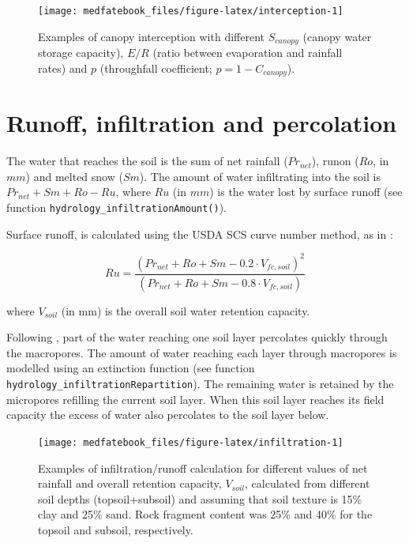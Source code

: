 \documentclass[]{book}
\begin{document}
\begin{figure}

{\centering \texttt{[image: medfatebook\_files/figure-latex/interception-1]} 

}

\caption{Examples of canopy interception with different
\(S_{canopy}\) (canopy water storage capacity), \(E/R\) (ratio between
evaporation and rainfall rates) and \(p\) (throughfall coefficient;
\(p = 1 - C_{canopy}\)).}\label{fig:interception}
\end{figure}

\section{Runoff, infiltration and percolation}\label{runoff}

The water that reaches the soil is the sum of net rainfall
(\(Pr_{net}\)), runon (\(Ro\), in \(mm\)) and melted snow (\(Sm\)). The
amount of water infiltrating into the soil is
\(Pr_{net} + Sm + Ro - Ru\), where \(Ru\) (in \(mm\)) is the water lost
by surface runoff (see function
\texttt{hydrology\_infiltrationAmount()}).

Surface runoff, is calculated using the USDA SCS curve number method, as
in \citet{Boughton1989}:

\begin{equation}
Ru=\frac{(Pr_{net} + Ro + Sm - 0.2 \cdot V_{fc, soil})^2}{(Pr_{net} + Ro + Sm - 0.8 \cdot V_{fc, soil})}
\end{equation}

where \(V_{soil}\) (in mm) is the overall soil water retention capacity.

Following \citet{Granier1999}, part of the water reaching one soil layer
percolates quickly through the macropores. The amount of water reaching
each layer through macropores is modelled using an extinction function
(see function \texttt{hydrology\_infiltrationRepartition}). The
remaining water is retained by the micropores refilling the current soil
layer. When this soil layer reaches its field capacity the excess of
water also percolates to the soil layer below.







\begin{figure}

{\centering \texttt{[image: medfatebook\_files/figure-latex/infiltration-1]} 

}

\caption{Examples of infiltration/runoff calculation for
different values of net rainfall and overall retention capacity,
\(V_{soil}\), calculated from different soil depths (topsoil+subsoil)
and assuming that soil texture is 15\% clay and 25\% sand. Rock fragment
content was 25\% and 40\% for the topsoil and subsoil, respectively.}\label{fig:infiltration}
\end{figure}
\end{document}
